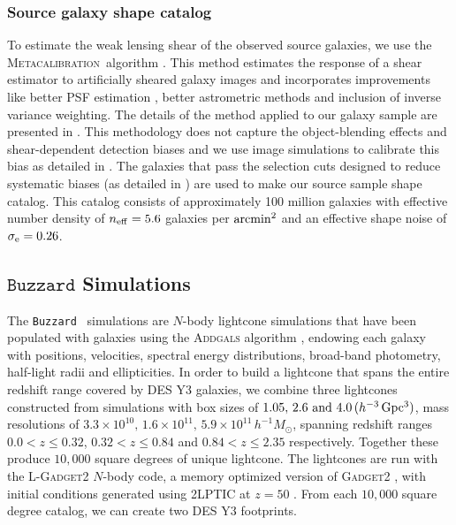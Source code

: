 \documentclass[aps, prd,twocolumn,superscriptaddress,nofootinbib,preprintnumbers]{revtex4-1}
\newcommand{\buzzard}{\texttt{Buzzard} }
\newcommand{\metacal}{{\textsc{Metacalibration}~}}
\begin{document}
\subsubsection{Source galaxy shape catalog}

To estimate the weak lensing shear of the observed source galaxies, we use the \metacal algorithm \citep{Sheldon_2017, huff2017metacalibration}. This method estimates the response of a shear estimator to artificially sheared galaxy images and incorporates improvements like better PSF estimation \citep{y3-piff}, better astrometric methods \citep{y3-gold} and inclusion of inverse variance weighting. The details of the method applied to our galaxy sample are presented in \cite{y3-shapecatalog}. This methodology does not capture the object-blending effects and shear-dependent detection biases and we use image simulations to calibrate this bias as detailed in \citet{y3-imagesims}. The galaxies that pass the selection cuts designed to reduce systematic biases (as detailed in \citet*{y3-shapecatalog}) are used to make our source sample shape catalog. This catalog consists of approximately 100 million galaxies with effective number density of $n_{\rm eff} = 5.6$ galaxies per ${\rm arcmin}^2$ and an effective shape noise of $\sigma_{\rm e} = 0.26$.



\subsection{$\buzzard$ Simulations}

The \buzzard\ simulations are $N$-body lightcone simulations that have been populated with galaxies using the \textsc{Addgals} algorithm \citep{Addgals}, endowing each galaxy with positions, velocities, spectral energy distributions, broad-band photometry, half-light radii and ellipticities. In order to build a lightcone that spans the entire redshift range covered by DES Y3 galaxies, we combine three lightcones constructed from simulations with box sizes of $1.05,\, 2.6 \textrm{ and } 4.0\, (h^{-3}\, \rm Gpc^3)$, mass resolutions of $3.3\times10^{10},\, 1.6\times10^{11},\, 5.9\times10^{11}\, h^{-1}M_{\odot}$, spanning redshift ranges $0.0< z \leq 0.32$, $0.32< z \leq 0.84$ and $0.84< z \leq 2.35$ respectively. Together these produce $10,000$ square degrees of unique lightcone. The lightcones are run with the \textsc{L-Gadget2} $N$-body code, a memory optimized version of \textsc{Gadget2} \citep{Springel_2005}, with initial conditions generated using \textsc{2LPTIC} at $z=50$ \citep{Crocce2012}. From each $10,000$ square degree catalog, we can create two DES Y3 footprints.
\end{document}
